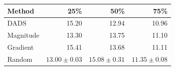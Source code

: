 \begin{tabular}{@{}lrrr@{}}
\toprule
Method & 25\% & 50\% & 75\%\\
\midrule
DADS & 15.20 & 12.94 & 10.96\\
Magnitude & 13.30 & 13.75 & 11.10\\
Gradient & 15.41 & 13.68 & 11.11\\
Random & $13.00\pm0.03$ & $15.08\pm0.31$ & $11.35\pm0.08$\\
\bottomrule
\end{tabular}
